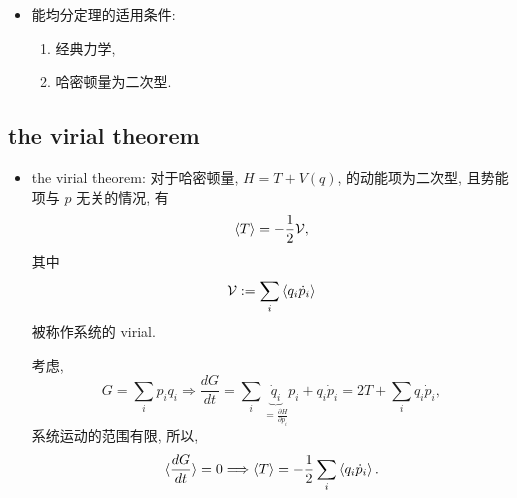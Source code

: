 \begin{itemize}
	\item 能均分定理的适用条件:
	\begin{enumerate}
		\item 经典力学,
		
		\item 哈密顿量为二次型.
	\end{enumerate}
\end{itemize}

\subsection{the virial theorem}
\begin{itemize}
	\item the virial theorem: 对于哈密顿量, $H = T + V(q)$, 的动能项为二次型, 且势能项与 $p$ 无关的情况, 有
	\begin{equation}
		\braket{T} = - \frac{1}{2} \mathcal{V},
	\end{equation}
	其中
	\begin{equation}
		\mathcal{V} := \sum_i \braket{q_i \dot{p}_i}
	\end{equation}
	被称作系统的 virial.
	
	\begin{tcolorbox}[title=proof:]
		考虑,
		\begin{equation}
			G = \sum_i p_i q_i \Longrightarrow \frac{d G}{dt} = \sum_i \underbrace{\dot{q}_i}_{= \frac{\partial H}{\partial p_i}} p_i + q_i \dot{p}_i = 2 T + \sum_i q_i \dot{p}_i,
		\end{equation}
		系统运动的范围有限, 所以,
		\begin{equation}
			\braket{\frac{d G}{dt}} = 0 \Longrightarrow \braket{T} = - \frac{1}{2} \sum_i \braket{q_i \dot{p}_i}.
		\end{equation}
	\end{tcolorbox}
\end{itemize}

